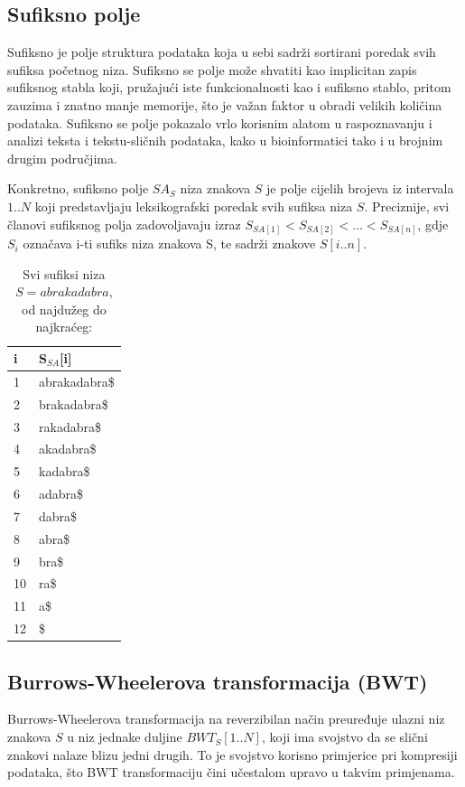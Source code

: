 \documentclass[a4paper,12pt]{article}
\begin{document}
\subsection{Sufiksno polje}

Sufiksno je polje struktura podataka koja u sebi sadrži sortirani poredak svih sufiksa početnog niza. Sufiksno se polje može shvatiti kao implicitan zapis sufiksnog stabla koji, pružajući iste funkcionalnosti kao i sufiksno stablo, pritom zauzima i znatno manje memorije, što je važan faktor u obradi velikih količina podataka. Sufiksno se polje pokazalo vrlo korisnim alatom u raspoznavanju i analizi teksta i tekstu-sličnih podataka, kako u bioinformatici tako i u brojnim drugim područjima. 

Konkretno, sufiksno polje $SA_S$ niza znakova $S$ je polje cijelih brojeva iz intervala $1..N$ koji predstavljaju leksikografski poredak svih sufiksa niza $S$. Preciznije, svi članovi sufiksnog polja zadovoljavaju izraz $ S_{SA[1]} < S_{SA[2]} < ... < S_{SA[n]}$, gdje $ S_i $ označava i-ti sufiks niza znakova S, te sadrži znakove $S[i..n]$.

\begin{table}[h!]
	\caption{Svi sufiksi niza $S = abrakadabra$, od najdužeg do najkraćeg:}
	\label{tablePrimjer1}
	\begin{center}
		\begin{tabular}{ll}
			\toprule
			i & S$_{SA}$[i] \\
			\midrule
			1 & abrakadabra\$ \\
			2 & brakadabra\$ \\
			3 & rakadabra\$ \\
			4 & akadabra\$ \\
			5 & kadabra\$ \\
			6 & adabra\$ \\
			7 & dabra\$ \\
			8 & abra\$ \\
			9 & bra\$ \\
			10 & ra\$ \\
			11 & a\$ \\
			12 & \$ \\
			\bottomrule
		\end{tabular}
	\end{center}
\end{table}

\subsection{Burrows-Wheelerova transformacija (BWT)}
Burrows-Wheelerova transformacija na reverzibilan način preuređuje ulazni niz znakova $S$ u niz jednake duljine $BWT_S[1..N]$, koji ima svojstvo da se slični znakovi nalaze blizu jedni drugih. To je svojstvo korisno primjerice pri kompresiji podataka, što BWT transformaciju čini učestalom upravo u takvim primjenama.
\end{document}
